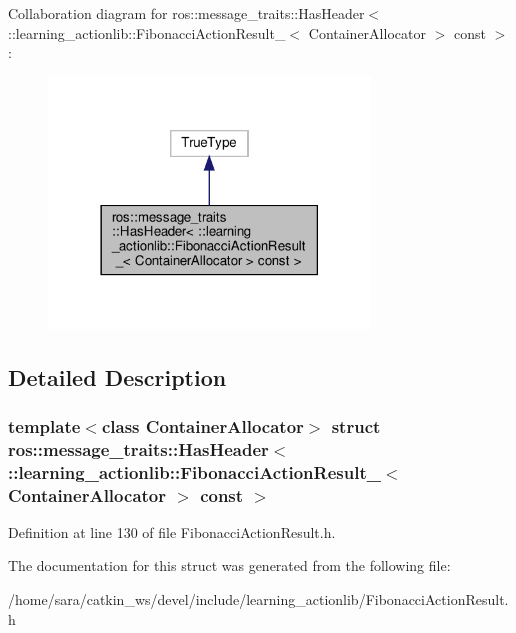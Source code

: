 Collaboration diagram for ros\+:\+:message\+\_\+traits\+:\+:Has\+Header$<$ \+:\+:learning\+\_\+actionlib\+:\+:Fibonacci\+Action\+Result\+\_\+$<$ Container\+Allocator $>$ const $>$\+:
\nopagebreak
\begin{figure}[H]
\begin{center}
\leavevmode
\includegraphics[width=242pt]{structros_1_1message__traits_1_1HasHeader_3_01_1_1learning__actionlib_1_1FibonacciActionResult__8fadf7f902e57d344bacd019ca42d555}
\end{center}
\end{figure}


\subsection{Detailed Description}
\subsubsection*{template$<$class Container\+Allocator$>$\newline
struct ros\+::message\+\_\+traits\+::\+Has\+Header$<$ \+::learning\+\_\+actionlib\+::\+Fibonacci\+Action\+Result\+\_\+$<$ Container\+Allocator $>$ const $>$}



Definition at line 130 of file Fibonacci\+Action\+Result.\+h.



The documentation for this struct was generated from the following file\+:\begin{DoxyCompactItemize}
\item 
/home/sara/catkin\+\_\+ws/devel/include/learning\+\_\+actionlib/Fibonacci\+Action\+Result.\+h\end{DoxyCompactItemize}
